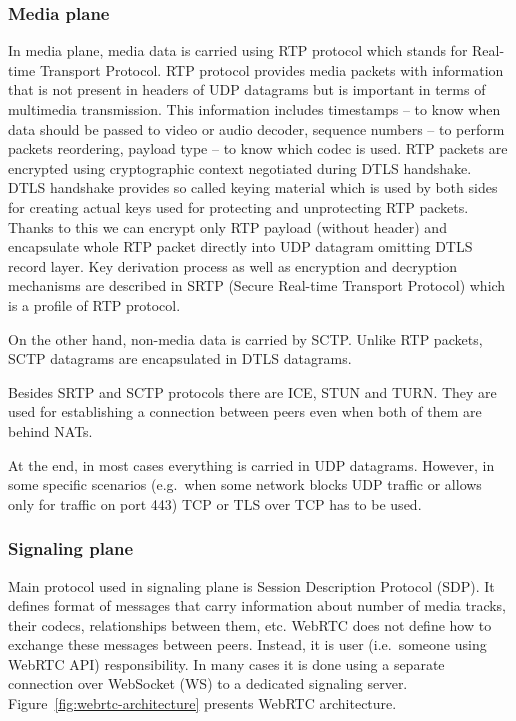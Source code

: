 \subsubsection{Media plane}
\label{subsubsec:media-plane}
In media plane, media data is carried using RTP protocol which stands for Real-time Transport Protocol.
RTP protocol provides media packets with information that is not present in headers of UDP datagrams but is important in terms of multimedia transmission.
This information includes timestamps -- to know when data should be passed to video or audio decoder, sequence numbers -- to perform packets reordering, payload type -- to know which codec is used.
RTP packets are encrypted using cryptographic context negotiated during DTLS handshake.
DTLS handshake provides so called keying material which is used by both sides for creating actual keys used for protecting and unprotecting RTP packets.
Thanks to this we can encrypt only RTP payload (without header) and encapsulate whole RTP packet directly into UDP datagram omitting DTLS record layer.
Key derivation process as well as encryption and decryption mechanisms are described in SRTP (Secure Real-time Transport Protocol) which is a profile of RTP protocol.

On the other hand, non-media data is carried by SCTP\@.
Unlike RTP packets, SCTP datagrams are encapsulated in DTLS datagrams.

Besides SRTP and SCTP protocols there are ICE, STUN and TURN\@.
They are used for establishing a connection between peers even when both of them are behind NATs.

At the end, in most cases everything is carried in UDP datagrams.
However, in some specific scenarios (e.g.\ when some network blocks UDP traffic or allows only for traffic on port 443) TCP or TLS over TCP has to be used.

\subsubsection{Signaling plane}
Main protocol used in signaling plane is Session Description Protocol (SDP).
It defines format of messages that carry information about number of media tracks, their codecs, relationships between them, etc.
WebRTC does not define how to exchange these messages between peers.
Instead, it is user (i.e.\ someone using WebRTC API) responsibility.
In many cases it is done using a separate connection over WebSocket (WS) to a dedicated signaling server.
Figure~\ref{fig:webrtc-architecture} presents WebRTC architecture.

